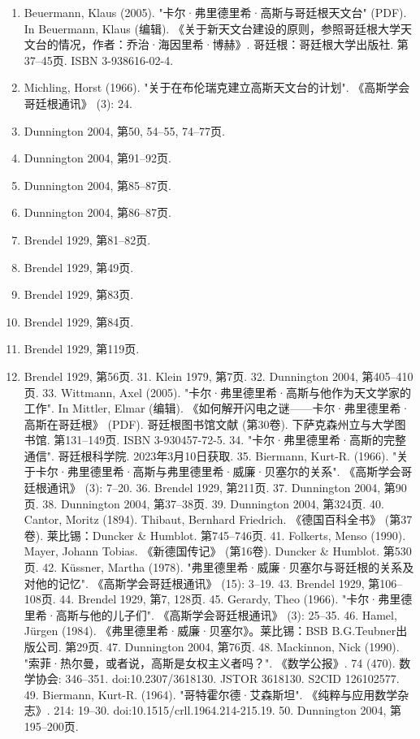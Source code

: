 \begin{enumerate}
\item Beuermann, Klaus (2005). "卡尔·弗里德里希·高斯与哥廷根天文台" (PDF). In Beuermann, Klaus (编辑). 《关于新天文台建设的原则，参照哥廷根大学天文台的情况，作者：乔治·海因里希·博赫》. 哥廷根：哥廷根大学出版社. 第37–45页. ISBN 3-938616-02-4.  
\item Michling, Horst (1966). "关于在布伦瑞克建立高斯天文台的计划". 《高斯学会哥廷根通讯》 (3): 24.  
\item Dunnington 2004, 第50, 54–55, 74–77页.  
\item Dunnington 2004, 第91–92页.  
\item Dunnington 2004, 第85–87页.  
\item Dunnington 2004, 第86–87页.  
\item Brendel 1929, 第81–82页.  
\item Brendel 1929, 第49页.  
\item Brendel 1929, 第83页.  
\item Brendel 1929, 第84页.  
\item Brendel 1929, 第119页.  
\item Brendel 1929, 第56页.  
31. Klein 1979, 第7页.  
32. Dunnington 2004, 第405–410页.  
33. Wittmann, Axel (2005). "卡尔·弗里德里希·高斯与他作为天文学家的工作". In Mittler, Elmar (编辑). 《如何解开闪电之谜——卡尔·弗里德里希·高斯在哥廷根》 (PDF). 哥廷根图书馆文献 (第30卷). 下萨克森州立与大学图书馆. 第131–149页. ISBN 3-930457-72-5.  
34. "卡尔·弗里德里希·高斯的完整通信". 哥廷根科学院. 2023年3月10日获取.  
35. Biermann, Kurt-R. (1966). "关于卡尔·弗里德里希·高斯与弗里德里希·威廉·贝塞尔的关系". 《高斯学会哥廷根通讯》 (3): 7–20.  
36. Brendel 1929, 第211页.  
37. Dunnington 2004, 第90页.  
38. Dunnington 2004, 第37–38页.  
39. Dunnington 2004, 第324页.  
40. Cantor, Moritz (1894). Thibaut, Bernhard Friedrich. 《德国百科全书》 (第37卷). 莱比锡：Duncker & Humblot. 第745–746页.  
41. Folkerts, Menso (1990). Mayer, Johann Tobias. 《新德国传记》 (第16卷). Duncker & Humblot. 第530页.  
42. Küssner, Martha (1978). "弗里德里希·威廉·贝塞尔与哥廷根的关系及对他的记忆". 《高斯学会哥廷根通讯》 (15): 3–19.  
43. Brendel 1929, 第106–108页.  
44. Brendel 1929, 第7, 128页.  
45. Gerardy, Theo (1966). "卡尔·弗里德里希·高斯与他的儿子们". 《高斯学会哥廷根通讯》 (3): 25–35.  
46. Hamel, Jürgen (1984). 《弗里德里希·威廉·贝塞尔》。莱比锡：BSB B.G.Teubner出版公司. 第29页.  
47. Dunnington 2004, 第76页.  
48. Mackinnon, Nick (1990). "索菲·热尔曼，或者说，高斯是女权主义者吗？". 《数学公报》. 74 (470). 数学协会: 346–351. doi:10.2307/3618130. JSTOR 3618130. S2CID 126102577.  
49. Biermann, Kurt-R. (1964). "哥特霍尔德·艾森斯坦". 《纯粹与应用数学杂志》. 214: 19–30. doi:10.1515/crll.1964.214-215.19.  
50. Dunnington 2004, 第195–200页.
\end{enumerate}